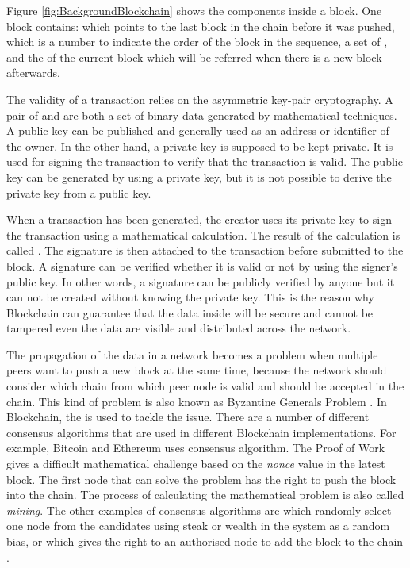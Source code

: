 \npara Figure \ref{fig:BackgroundBlockchain} shows the components inside a block.
One block contains:
   which points to the last block in the chain before it was pushed,
   which is a number to indicate the order of the block in the sequence,
  a set of ,
  and the  of the current block which will be referred when there is a new block afterwards.

\npara The validity of a transaction relies on the asymmetric key-pair cryptography.
A pair of  and  are both a set of binary data generated by mathematical techniques.
A public key can be published and generally used as an address or identifier of the owner.
In the other hand, a private key is supposed to be kept private.
It is used for signing the transaction to verify that the transaction is valid.
The public key can be generated by using a private key, but it is not possible to derive the private key from a public key.

\npara When a transaction has been generated, the creator uses its private key to sign the transaction using a mathematical calculation.
The result of the calculation is called .
The signature is then attached to the transaction before submitted to the block.
A signature can be verified whether it is valid or not by using the signer's public key.
In other words, a signature can be publicly verified by anyone but it can not be created without knowing the private key.
This is the reason why Blockchain can guarantee that the data inside will be secure and cannot be tampered even the data are visible and distributed across the network.

\npara The propagation of the data in a network becomes a problem when multiple peers want to push a new block at the same time, because the network should consider which chain from which peer node is valid and should be accepted in the chain.
This kind of problem is also known as Byzantine Generals Problem \citep{Byzantine}.
In Blockchain, the  is used to tackle the issue.
There are a number of different consensus algorithms that are used in different Blockchain implementations.
For example, Bitcoin and Ethereum uses  consensus algorithm.
The Proof of Work gives a difficult mathematical challenge based on the \textit{nonce} value in the latest block.
The first node that can solve the problem has the right to push the block into the chain.
The process of calculating the mathematical problem is also called \textit{mining}.
The other examples of consensus algorithms are  which randomly select one node from the candidates using steak or wealth in the system as a random bias, or  which gives the right to an authorised node to add the block to the chain \citep{ConsensusAlgorithm}.


